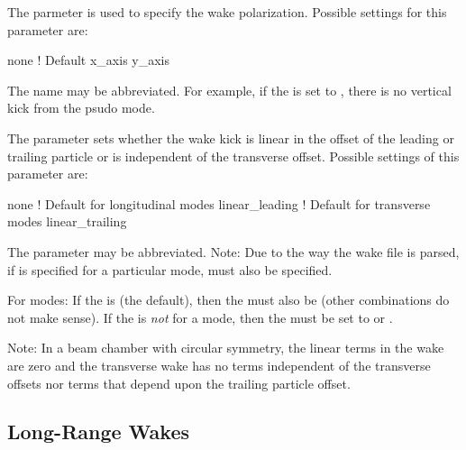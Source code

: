 The  parmeter is used to specify the wake
polarization. Possible settings for this parameter are:
\begin{example}
  none    ! Default
  x_axis  
  y_axis 
\end{example}
The  name may be abbreviated.  For example, if the
 is set to , there is no vertical kick
from the psudo mode.

The  parameter sets whether the wake kick
is linear in the offset of the leading or trailing particle or is
independent of the transverse offset.
Possible settings of this parameter are:
\begin{example}
  none              ! Default for longitudinal modes
  linear_leading    ! Default for transverse modes
  linear_trailing
\end{example}
The  parameter may be abbreviated. Note: Due
to the way the wake file is parsed, if  is
specified for a particular mode,  must also be
specified.

For  modes: If the  is
 (the default), then the  must also be
 (other combinations do not make sense). If the
 is \emph{not}  for a
 mode, then the  must be set
to  or . 

Note: In a beam chamber with circular symmetry, the linear terms in
the  wake are zero and the transverse wake has
no terms independent of the transverse offsets nor terms that
depend upon the trailing particle offset.

\subsection{Long-Range Wakes}

